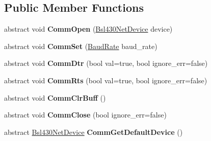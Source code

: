 \subsection*{Public Member Functions}
\begin{DoxyCompactItemize}
\item 
\mbox{\label{class_b_s_l430___n_e_t_1_1_main_1_1_core_addc829641b9e797f7d50e0cf6a7449d5}} 
abstract void {\bfseries Comm\+Open} (\mbox{\hyperlink{class_b_s_l430___n_e_t_1_1_bsl430_net_device}{Bsl430\+Net\+Device}} device)
\item 
\mbox{\label{class_b_s_l430___n_e_t_1_1_main_1_1_core_a768e27ac6ffe9758326d55540248cc5e}} 
abstract void {\bfseries Comm\+Set} (\mbox{\hyperlink{namespace_b_s_l430___n_e_t_a8d30c263598635a481840944d38aeb70}{Baud\+Rate}} baud\+\_\+rate)
\item 
\mbox{\label{class_b_s_l430___n_e_t_1_1_main_1_1_core_aaa77ee7c594b184239e93acf33c9f97e}} 
abstract void {\bfseries Comm\+Dtr} (bool val=true, bool ignore\+\_\+err=false)
\item 
\mbox{\label{class_b_s_l430___n_e_t_1_1_main_1_1_core_a87380d3d911f9ebf6052c7f15dddf52c}} 
abstract void {\bfseries Comm\+Rts} (bool val=true, bool ignore\+\_\+err=false)
\item 
\mbox{\label{class_b_s_l430___n_e_t_1_1_main_1_1_core_aa0a993bdf041dc723294771e65a50e7b}} 
abstract void {\bfseries Comm\+Clr\+Buff} ()
\item 
\mbox{\label{class_b_s_l430___n_e_t_1_1_main_1_1_core_a1760fccc57903c0c7c1bab9fe690a556}} 
abstract void {\bfseries Comm\+Close} (bool ignore\+\_\+err=false)
\item 
\mbox{\label{class_b_s_l430___n_e_t_1_1_main_1_1_core_a9604811de8049600035a37c4a1f663de}} 
abstract \mbox{\hyperlink{class_b_s_l430___n_e_t_1_1_bsl430_net_device}{Bsl430\+Net\+Device}} {\bfseries Comm\+Get\+Default\+Device} ()
\item 
\mbox{\label{class_b_s_l430___n_e_t_1_1_main_1_1_core_a0e1685efd3042cd575209a0410a7444e}} 

\end{DoxyCompactItemize}
